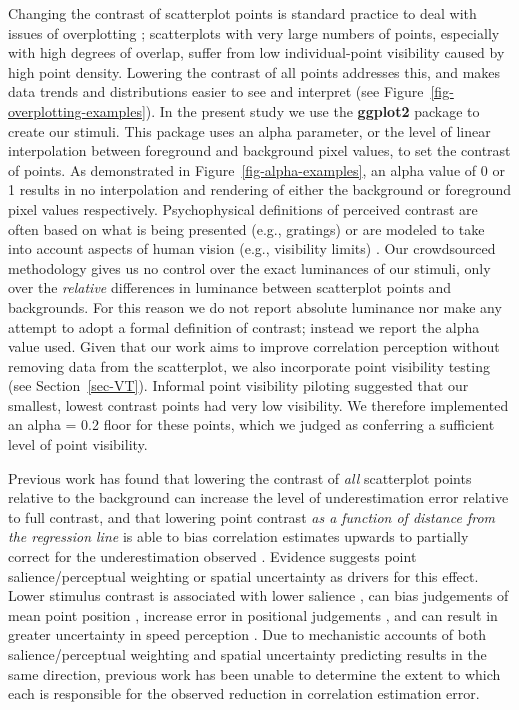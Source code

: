 \documentclass[manuscript, review, anonymous, screen]{acmart}
\begin{document}
Changing the contrast of scatterplot points is standard practice to deal
with issues of overplotting \citep{matejka_2015, bertini_2004};
scatterplots with very large numbers of points, especially with high
degrees of overlap, suffer from low individual-point visibility caused
by high point density. Lowering the contrast of all points addresses
this, and makes data trends and distributions easier to see and
interpret (see Figure~\ref{fig-overplotting-examples}). In the present
study we use the \textbf{ggplot2} package \citep{hadley_gg2016} to
create our stimuli. This package uses an alpha parameter, or the level
of linear interpolation \citep{stone_2008} between foreground and
background pixel values, to set the contrast of points. As demonstrated
in Figure~\ref{fig-alpha-examples}, an alpha value of 0 or 1 results in
no interpolation and rendering of either the background or foreground
pixel values respectively. Psychophysical definitions of perceived
contrast are often based on what is being presented (e.g., gratings) or
are modeled to take into account aspects of human vision (e.g.,
visibility limits) \citep{zuffi_2007}. Our crowdsourced methodology
gives us no control over the exact luminances of our stimuli, only over
the \emph{relative} differences in luminance between scatterplot points
and backgrounds. For this reason we do not report absolute luminance nor
make any attempt to adopt a formal definition of contrast; instead we
report the alpha value used. Given that our work aims to improve
correlation perception without removing data from the scatterplot, we
also incorporate point visibility testing (see Section~\ref{sec-VT}).
Informal point visibility piloting suggested that our smallest, lowest
contrast points had very low visibility. We therefore implemented an
alpha = 0.2 floor for these points, which we judged as conferring a
sufficient level of point visibility.

Previous work has found that lowering the contrast of \emph{all}
scatterplot points relative to the background can increase the level of
underestimation error relative to full contrast, and that lowering point
contrast \emph{as a function of distance from the regression line} is
able to bias correlation estimates upwards to partially correct for the
underestimation observed \citep{strain_2023}. Evidence suggests point
salience/perceptual weighting or spatial uncertainty as drivers for this
effect. Lower stimulus contrast is associated with lower salience
\citep{healey_2011}, can bias judgements of mean point position
\citep{hong_2021}, increase error in positional judgements
\citep{wehrhahn_1990}, and can result in greater uncertainty in speed
perception \citep{champion_2017}. Due to mechanistic accounts of both
salience/perceptual weighting and spatial uncertainty predicting results
in the same direction, previous work \citep{strain_2023} has been unable
to determine the extent to which each is responsible for the observed
reduction in correlation estimation error.
\end{document}
